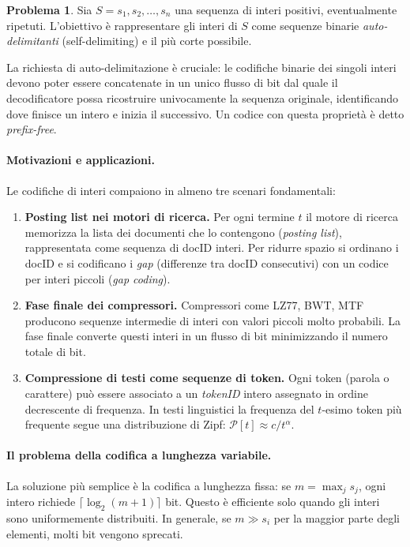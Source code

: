 \documentclass[12pt, a4paper, oneside]{book}
\theoremstyle{plain}
\theoremstyle{definition}
\newtheorem{problema}[teorema]{Problema}
\theoremstyle{remark}
\begin{document}
\begin{problema}
Sia $S = s_1, s_2, \ldots, s_n$ una sequenza di interi positivi, eventualmente ripetuti. L'obiettivo è rappresentare gli interi di $S$ come sequenze binarie \emph{auto-delimitanti} (self-delimiting) e il più corte possibile.
\end{problema}

La richiesta di auto-delimitazione è cruciale: le codifiche binarie dei singoli interi devono poter essere concatenate in un unico flusso di bit dal quale il decodificatore possa ricostruire univocamente la sequenza originale, identificando dove finisce un intero e inizia il successivo. Un codice con questa proprietà è detto \emph{prefix-free}.

\paragraph{Motivazioni e applicazioni.}
Le codifiche di interi compaiono in almeno tre scenari fondamentali:
\begin{enumerate}
  \item \textbf{Posting list nei motori di ricerca.} Per ogni termine $t$ il motore di ricerca memorizza la lista dei documenti che lo contengono (\emph{posting list}), rappresentata come sequenza di docID interi. Per ridurre spazio si ordinano i docID e si codificano i \emph{gap} (differenze tra docID consecutivi) con un codice per interi piccoli (\emph{gap coding}).
  \item \textbf{Fase finale dei compressori.} Compressori come LZ77, BWT, MTF producono sequenze intermedie di interi con valori piccoli molto probabili. La fase finale converte questi interi in un flusso di bit minimizzando il numero totale di bit.
  \item \textbf{Compressione di testi come sequenze di token.} Ogni token (parola o carattere) può essere associato a un \emph{tokenID} intero assegnato in ordine decrescente di frequenza. In testi linguistici la frequenza del $t$-esimo token più frequente segue una distribuzione di Zipf: $\mathcal{P}[t] \approx c / t^\alpha$.
\end{enumerate}

\paragraph{Il problema della codifica a lunghezza variabile.}
La soluzione più semplice è la codifica a lunghezza fissa: se $m = \max_j s_j$, ogni intero richiede $\lceil \log_2(m+1) \rceil$ bit. Questo è efficiente solo quando gli interi sono uniformemente distribuiti. In generale, se $m \gg s_i$ per la maggior parte degli elementi, molti bit vengono sprecati.
\end{document}
